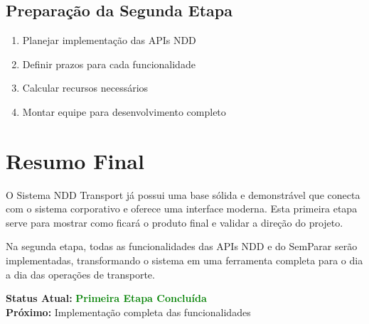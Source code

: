 \documentclass[12pt,a4paper]{article}
\begin{document}
\subsection{Preparação da Segunda Etapa}
\begin{enumerate}
    \item Planejar implementação das APIs NDD
    \item Definir prazos para cada funcionalidade
    \item Calcular recursos necessários
    \item Montar equipe para desenvolvimento completo
\end{enumerate}

\vfill

\section*{Resumo Final}

O Sistema NDD Transport já possui uma base sólida e demonstrável que conecta com o sistema corporativo e oferece uma interface moderna. Esta primeira etapa serve para mostrar como ficará o produto final e validar a direção do projeto.

Na segunda etapa, todas as funcionalidades das APIs NDD e do SemParar serão implementadas, transformando o sistema em uma ferramenta completa para o dia a dia das operações de transporte.

\textbf{Status Atual:} \textcolor{green}{\textbf{Primeira Etapa Concluída}} \\
\textbf{Próximo:} Implementação completa das funcionalidades
\end{document}
